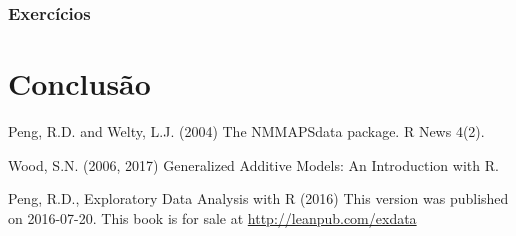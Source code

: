 \documentclass[]{book}
\begin{document}
\hypertarget{exercuxedcios-7}{%
\subsection{Exercícios}\label{exercuxedcios-7}}

\hypertarget{summary}{%
\chapter{Conclusão}\label{summary}}

Peng, R.D. and Welty, L.J. (2004) The NMMAPSdata package. R News 4(2).

Wood, S.N. (2006, 2017) Generalized Additive Models: An Introduction with R.

Peng, R.D., Exploratory Data Analysis with R (2016) This version was published on 2016-07-20. This book is for sale at \url{http://leanpub.com/exdata}


\end{document}
